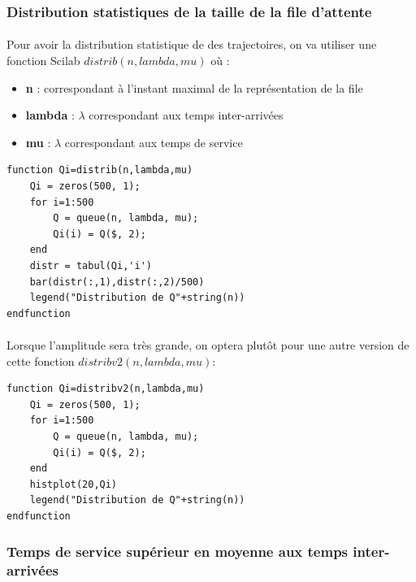 \documentclass{article}
\begin{document}
\subsubsection{Distribution statistiques de la taille de la file d'attente}
\paragraph{}
Pour avoir la distribution statistique de des trajectoires, on va utiliser une fonction Scilab $distrib(n,lambda,mu)$ où :
\begin{itemize}
	\item \textbf{n} : correspondant à l'instant maximal de la représentation de la file
	\item \textbf{lambda} : $\lambda$ correspondant aux temps inter-arrivées
	\item \textbf{mu} :  $\lambda$ correspondant aux temps de service
\end{itemize}
\begin{verbatim}
function Qi=distrib(n,lambda,mu)
	Qi = zeros(500, 1);
	for i=1:500
		Q = queue(n, lambda, mu);
		Qi(i) = Q($, 2);
	end
	distr = tabul(Qi,'i')
	bar(distr(:,1),distr(:,2)/500)
	legend("Distribution de Q"+string(n))
endfunction
\end{verbatim}
\paragraph{}
Lorsque l'amplitude sera très grande, on optera plutôt pour une autre version de cette fonction $distribv2(n,lambda,mu)$: 
\begin{verbatim}
function Qi=distribv2(n,lambda,mu)
	Qi = zeros(500, 1);
	for i=1:500
		Q = queue(n, lambda, mu);
		Qi(i) = Q($, 2);
	end
	histplot(20,Qi)
	legend("Distribution de Q"+string(n))
endfunction
\end{verbatim}

\subsubsection{Temps de service supérieur en moyenne aux temps inter-arrivées}
\end{document}

